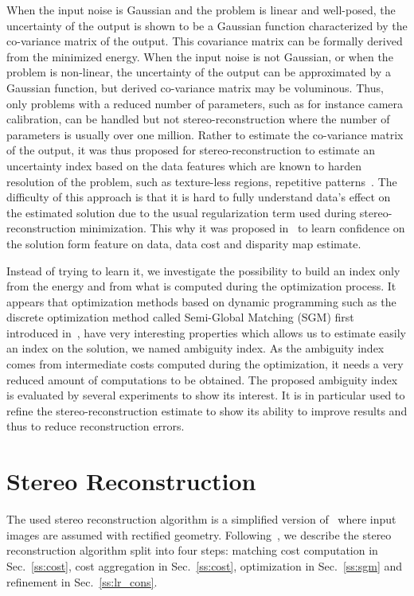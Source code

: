 \documentclass{article}
\begin{document}
When the input noise is Gaussian and the problem is linear and well-posed, the uncertainty of the output is shown to be a Gaussian function characterized by the co-variance matrix of the output. This covariance matrix can be formally derived from the minimized energy. When the input noise is not Gaussian, or when the problem is non-linear, the uncertainty of the output can be approximated by a Gaussian function, but derived co-variance matrix may be voluminous. Thus, only problems with a reduced number of parameters, such as for instance camera calibration, can be handled but not stereo-reconstruction where the number of parameters is usually over one million. Rather to estimate the co-variance matrix of the output, it was thus proposed for stereo-reconstruction to estimate an uncertainty index based on the data features which are known to harden resolution of the problem, such as texture-less regions, repetitive patterns~\cite{hu12}. The difficulty of this approach is that it is hard to fully understand data's effect on the estimated solution due to the usual regularization term used during stereo-reconstruction minimization.
This why it was proposed in~\cite{haeusler13, spyropoulos14, park15, seki16} to learn confidence on the solution form feature on data, data cost and disparity map estimate.

Instead of trying to learn it, we investigate the possibility to build an index only from the energy and from what is computed during the optimization process. It appears that optimization methods based on dynamic programming such as the discrete optimization method called Semi-Global Matching (SGM) first introduced in~\cite{hirschmuller08}, have very interesting properties which allows us to estimate easily an index on the solution, we named ambiguity index. As the ambiguity index comes from intermediate costs computed during the optimization, it needs a very reduced amount of computations to be obtained. The proposed ambiguity index is evaluated by several experiments to show its interest. It is in particular used to refine the stereo-reconstruction estimate to show its ability to improve results and thus to reduce reconstruction errors.

\section{Stereo Reconstruction}
\label{sec:index}

The used stereo reconstruction algorithm is a simplified version of~\cite{zbontar16} where input images are assumed with rectified geometry. Following~\cite{scharstein02}, we describe the stereo reconstruction algorithm split into four steps: matching cost computation in Sec.~\ref{ss:cost}, cost aggregation in Sec.~\ref{ss:cost}, optimization in Sec.~\ref{ss:sgm} and refinement in Sec.~\ref{ss:lr_cons}.
\end{document}
